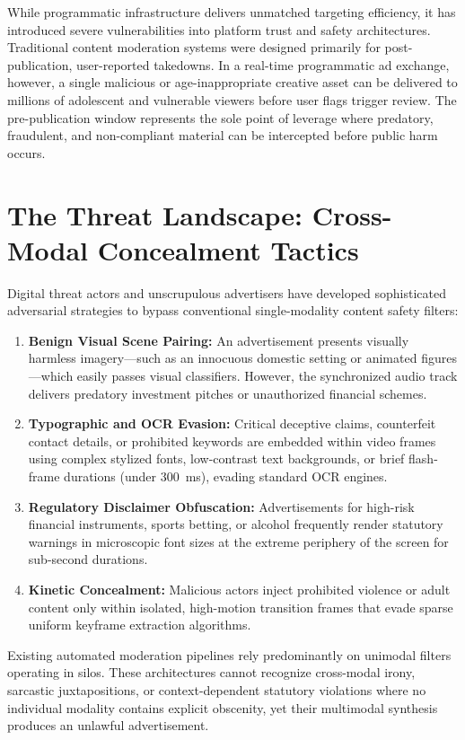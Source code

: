 \documentclass[12pt,a4paper]{report}
\begin{document}
While programmatic infrastructure delivers unmatched targeting efficiency, it has introduced severe vulnerabilities into platform trust and safety architectures. Traditional content moderation systems were designed primarily for post-publication, user-reported takedowns. In a real-time programmatic ad exchange, however, a single malicious or age-inappropriate creative asset can be delivered to millions of adolescent and vulnerable viewers before user flags trigger review. The pre-publication window represents the sole point of leverage where predatory, fraudulent, and non-compliant material can be intercepted before public harm occurs.

\section{The Threat Landscape: Cross-Modal Concealment Tactics}
Digital threat actors and unscrupulous advertisers have developed sophisticated adversarial strategies to bypass conventional single-modality content safety filters:
\begin{enumerate}
    \item \textbf{Benign Visual Scene Pairing:} An advertisement presents visually harmless imagery---such as an innocuous domestic setting or animated figures---which easily passes visual classifiers. However, the synchronized audio track delivers predatory investment pitches or unauthorized financial schemes.
    \item \textbf{Typographic and OCR Evasion:} Critical deceptive claims, counterfeit contact details, or prohibited keywords are embedded within video frames using complex stylized fonts, low-contrast text backgrounds, or brief flash-frame durations (under 300~ms), evading standard OCR engines.
    \item \textbf{Regulatory Disclaimer Obfuscation:} Advertisements for high-risk financial instruments, sports betting, or alcohol frequently render statutory warnings in microscopic font sizes at the extreme periphery of the screen for sub-second durations.
    \item \textbf{Kinetic Concealment:} Malicious actors inject prohibited violence or adult content only within isolated, high-motion transition frames that evade sparse uniform keyframe extraction algorithms.
\end{enumerate}

Existing automated moderation pipelines rely predominantly on unimodal filters operating in silos. These architectures cannot recognize cross-modal irony, sarcastic juxtapositions, or context-dependent statutory violations where no individual modality contains explicit obscenity, yet their multimodal synthesis produces an unlawful advertisement.
\end{document}
